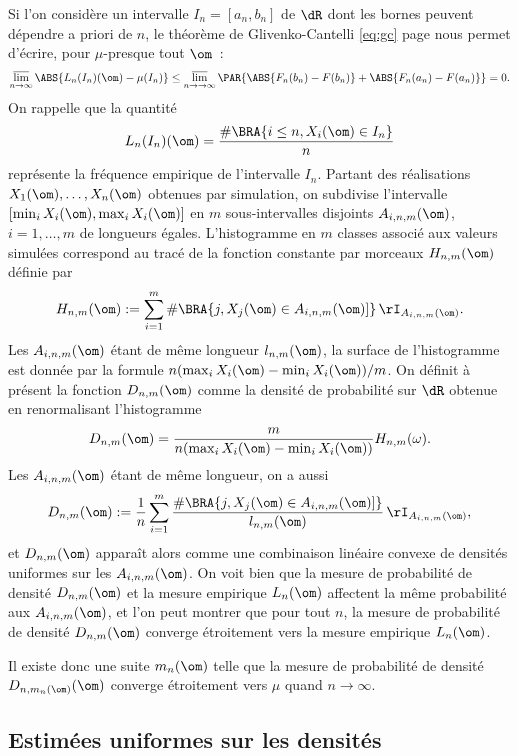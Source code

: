 Si l'on considère un intervalle $I_n=[a_n,b_n]$ de $\dR$ dont les bornes
peuvent dépendre a priori de $n$, le théorème de Glivenko-Cantelli
\eqref{eq:gc} page \pageref{th:gc} nous permet d'écrire, pour $\mu$-presque tout
$\om$~:
$$
\varlimsup_{n\to\infty} \ABS{L_n(I_n)(\om)-\mu(I_n)}
\leq\varlimsup_{n\to\to\infty}\PAR{\ABS{F_n(b_n)-F(b_n)}+\ABS{F_n(a_n)-F(a_n)}}= 0.
$$
On rappelle que la quantité
$$
L_n(I_n)(\om)=\frac{\#\BRA{i\leq n, X_i(\om)\in I_n}}{n}
$$
représente la fréquence empirique de l'intervalle $I_n$.  Partant des
réalisations $X_1(\om),\ldots,X_n(\om)$ obtenues par simulation, on subdivise
l'intervalle $[\min_i X_i(\om),\max_i X_i(\om)]$ en $m$ sous-intervalles
disjoints $A_{i,n,m}(\om)$, $i=1,\ldots,m$ de longueurs égales.  L'histogramme
en $m$ classes associé aux valeurs simulées correspond au tracé de la fonction
constante par morceaux $H_{n,m}(\om)$ définie par
$$
H_{n,m}(\om):=\sum_{i=1}^m \#\BRA{j, X_j(\om)\in A_{i,n,m}(\om)]}\,\rI_{A_{i,n,m}(\om)}.
$$
Les $A_{i,n,m}(\om)$ étant de même longueur $l_{n,m}(\om)$, la surface de
l'histogramme est donnée par la formule $n(\max_i X_i(\om)-\min_i
X_i(\om))/m$.  On définit à présent la fonction $D_{n,m}(\om)$ comme la
densité de probabilité sur $\dR$ obtenue en renormalisant l'histogramme
$$
D_{n,m}(\om)=\frac{m}{n(\max_i X_i(\om)-\min_i X_i(\om))} H_{n,m}(\omega).
$$
Les $A_{i,n,m}(\om)$ étant de même longueur, on a aussi
$$
D_{n,m}(\om):=
\frac{1}{n}\sum_{i=1}^m\frac{\#\BRA{j, X_j(\om)\in A_{i,n,m}(\om)]}}{l_{n,m}(\om)}\,\rI_{A_{i,n,m}(\om)},
$$
et $D_{n,m}(\om)$ apparaît alors comme une combinaison linéaire convexe de
densités uniformes sur les $A_{i,n,m}(\om)$. On voit bien que la mesure de
probabilité de densité $D_{n,m}(\om)$ et la mesure empirique $L_n(\om)$
affectent la même probabilité aux $A_{i,n,m}(\om)$, et l'on peut montrer que
pour tout $n$, la mesure de probabilité de densité $D_{n,m}(\om)$ converge
étroitement vers la mesure empirique $L_n(\om)$.

Il existe donc une suite $m_n(\om)$ telle que la mesure de probabilité de
densité $D_{n,m_n(\om)}(\om)$ converge étroitement vers $\mu$ quand
$n\to\infty$.

\subsection{Estimées uniformes sur les densités}


